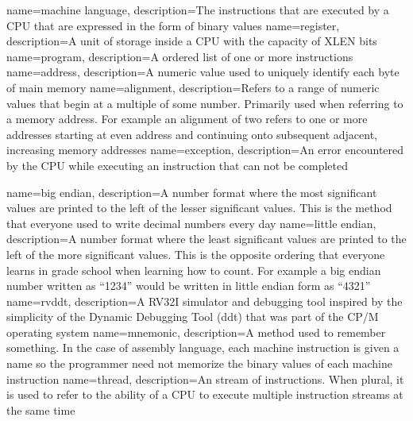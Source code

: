 {
	name={machine language},
	description={The instructions that are executed by a CPU that are expressed
		in the form of binary values}
}
{
	name={register},
	description={A unit of storage inside a CPU with the capacity of XLEN bits}
}
{
	name={program},
	description={A ordered list of one or more instructions}
}
{
	name={address},
	description={A numeric value used to uniquely identify each byte of main memory}
}
{
	name={alignment},
	description={Refers to a range of numeric values that begin 
		at a multiple of some number.  Primarily used when referring to
		a memory address.  For example an alignment of two refers to one
		or more addresses starting at even address and continuing onto
		subsequent adjacent, increasing memory addresses}
}
{
	name={exception},
	description={An error encountered by the CPU while executing an instruction
		that can not be completed}
}

{
	name={big endian},
	description={A number format where the most significant values are 
	printed to the left of the lesser significant values.  This is the
	method that everyone used to write decimal numbers every day}
}
{
	name={little endian},
	description={A number format where the least significant values are 
		printed to the left of the more significant values.  This is the
		opposite ordering that everyone learns in grade school when learning
		how to count.  For example a big endian number written as ``1234''
		would be written in little endian form as ``4321''}
}
{
	name={rvddt},
	description={A RV32I simulator and debugging tool inspired by the 
		simplicity of the Dynamic Debugging Tool (ddt) that was part of 
		the CP/M operating system}
}
{
	name={mnemonic},
	description={A method used to remember something.  In the case of
		assembly language, each machine instruction is given a name
		so the programmer need not memorize the binary values of each
		machine instruction}
}
{
	name={thread},
	description={An stream of instructions.  When plural, it is
		used to refer to the ability of a CPU to execute multiple 
		instruction streams at the same time}
}

